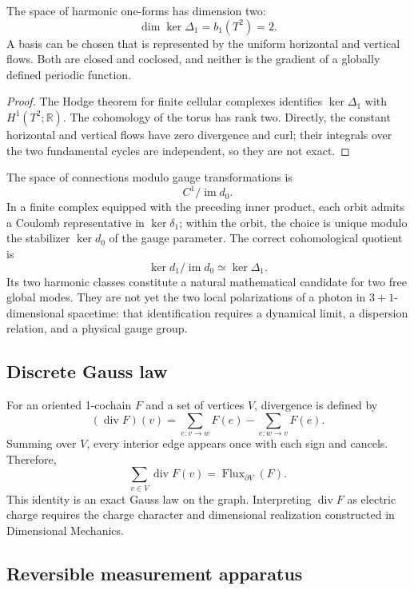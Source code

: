 \begin{theorem}
\label{v:rec:completaciones:statement:04}
The space of harmonic one-forms has dimension two:
\[
 \dim\ker\Delta_1=b_1(T^2)=2.
\]
A basis can be chosen that is represented by the uniform horizontal and
vertical flows. Both are closed and coclosed, and neither is the gradient of
a globally defined periodic function.
\end{theorem}

\begin{proof}
The Hodge theorem for finite cellular complexes identifies
\(\ker\Delta_1\) with \(H^1(T^2;\mathbb R)\). The cohomology of the torus has
rank two. Directly, the constant horizontal and vertical flows have
zero divergence and curl; their integrals over the two fundamental
cycles are independent, so they are not exact.
\end{proof}

The space of connections modulo gauge transformations is
\[
 C^1/\operatorname{im}d_0.
\]
In a finite complex equipped with the preceding inner product, each orbit
admits a Coulomb representative in \(\ker\delta_1\); within the orbit,
the choice is unique modulo the stabilizer \(\ker d_0\) of the gauge
parameter. The correct cohomological quotient is
\[
 \ker d_1/\operatorname{im}d_0
 \simeq \ker\Delta_1 .
\]
Its two harmonic classes constitute a natural mathematical candidate for
two free global modes. They are not yet the two local polarizations of
a photon in \(3+1\)-dimensional spacetime: that identification requires a
dynamical limit, a dispersion relation, and a physical gauge group.

\subsection{Discrete Gauss law}
\label{v:rec:completaciones:section:09}

For an oriented 1-cochain \(F\) and a set of vertices \(V\),
divergence is defined by
\[
 (\operatorname{div}F)(v)=
 \sum_{e:v\to w}F(e)-\sum_{e:w\to v}F(e).
\]
Summing over \(V\), every interior edge appears once with each sign and
cancels. Therefore,
\[
 \boxed{
 \sum_{v\in V}\operatorname{div}F(v)
 =\operatorname{Flux}_{\partial V}(F).}
\]
This identity is an exact Gauss law on the graph. Interpreting
\(\operatorname{div}F\) as electric charge requires the charge character and
dimensional realization constructed in Dimensional Mechanics.

\subsection{Reversible measurement apparatus}
\label{v:rec:completaciones:section:10}

